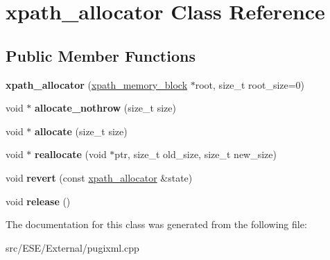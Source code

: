 \hypertarget{classxpath__allocator}{\section{xpath\-\_\-allocator Class Reference}
\label{classxpath__allocator}
}
\subsection*{Public Member Functions}
\begin{DoxyCompactItemize}
\item 
\hypertarget{classxpath__allocator_a3b8ba1722fba115d05949d8f592080e8}{{\bfseries xpath\-\_\-allocator} (\hyperlink{structxpath__memory__block}{xpath\-\_\-memory\-\_\-block} $\ast$root, size\-\_\-t root\-\_\-size=0)}\label{classxpath__allocator_a3b8ba1722fba115d05949d8f592080e8}

\item 
\hypertarget{classxpath__allocator_aa66f3703548657eca5316392a2d79d00}{void $\ast$ {\bfseries allocate\-\_\-nothrow} (size\-\_\-t size)}\label{classxpath__allocator_aa66f3703548657eca5316392a2d79d00}

\item 
\hypertarget{classxpath__allocator_aad95aa445f2fdc7c3d1c19b1f3d67cb1}{void $\ast$ {\bfseries allocate} (size\-\_\-t size)}\label{classxpath__allocator_aad95aa445f2fdc7c3d1c19b1f3d67cb1}

\item 
\hypertarget{classxpath__allocator_a4dd502389202ec8e7420832112a571e5}{void $\ast$ {\bfseries reallocate} (void $\ast$ptr, size\-\_\-t old\-\_\-size, size\-\_\-t new\-\_\-size)}\label{classxpath__allocator_a4dd502389202ec8e7420832112a571e5}

\item 
\hypertarget{classxpath__allocator_af1c3ec117935d4488bbd16adf807fbc1}{void {\bfseries revert} (const \hyperlink{classxpath__allocator}{xpath\-\_\-allocator} \&state)}\label{classxpath__allocator_af1c3ec117935d4488bbd16adf807fbc1}

\item 
\hypertarget{classxpath__allocator_a9436b8bdef3e0e0ff0df28c2af6a430d}{void {\bfseries release} ()}\label{classxpath__allocator_a9436b8bdef3e0e0ff0df28c2af6a430d}

\end{DoxyCompactItemize}


The documentation for this class was generated from the following file\-:\begin{DoxyCompactItemize}
\item 
src/\-E\-S\-E/\-External/pugixml.\-cpp\end{DoxyCompactItemize}
